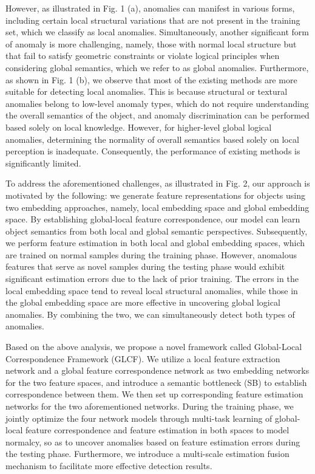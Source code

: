 \documentclass[lettersize,journal]{IEEEtran}
\begin{document}
However, as illustrated in Fig. 1 (a), anomalies can manifest in various forms, including certain local structural variations that are not present in the training set, which we classify as local anomalies. Simultaneously, another significant form of anomaly is more challenging, namely, those with normal local structure but that fail to satisfy geometric constraints or violate logical principles when considering global semantics, which we refer to as global anomalies. Furthermore, as shown in Fig. 1 (b), we observe that most of the existing methods\cite{r20} are more suitable for detecting local anomalies. This is because structural or textural anomalies belong to low-level anomaly types, which do not require understanding the overall semantics of the object, and anomaly discrimination can be performed based solely on local knowledge. However, for higher-level global logical anomalies, determining the normality of overall semantics based solely on local perception is inadequate. Consequently, the performance of existing methods is significantly limited.


To address the aforementioned challenges, as illustrated in Fig. 2, our approach is motivated by the following: we generate feature representations for objects using two embedding approaches, namely, local embedding space and global embedding space. By establishing global-local feature correspondence, our model can learn object semantics from both local and global semantic perspectives. Subsequently, we perform feature estimation in both local and global embedding spaces, which are trained on normal samples during the training phase. However, anomalous features that serve as novel samples during the testing phase would exhibit significant estimation errors due to the lack of prior training. The errors in the local embedding space tend to reveal local structural anomalies, while those in the global embedding space are more effective in uncovering global logical anomalies. By combining the two, we can simultaneously detect both types of anomalies.

Based on the above analysis, we propose a novel framework called Global-Local Correspondence Framework (GLCF). We utilize a local feature extraction network and a global feature correspondence network as two embedding networks for the two feature spaces, and introduce a semantic bottleneck (SB) to establish correspondence between them. We then set up corresponding feature estimation networks for the two aforementioned networks. During the training phase, we jointly optimize the four network models through multi-task learning of global-local feature correspondence and feature estimation in both spaces to model normalcy, so as to uncover anomalies based on feature estimation errors during the testing phase. Furthermore, we introduce a multi-scale estimation fusion mechanism to facilitate more effective detection results.
\end{document}
